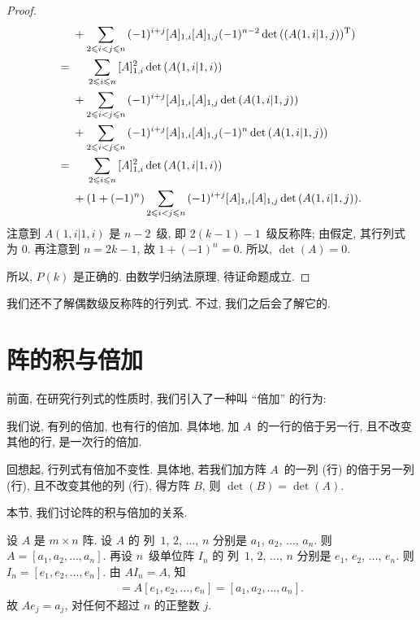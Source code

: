 \begin{proof}
\begin{align*}
             & +
        \sum_{2 \leq i < j \leq n} {
            (-1)^{i+j}
                [A]_{1,i} [A]_{1,j}
            (-1)^{n-2} \det {((A(1,i|1,j))^{\mathrm{T}})}
        }
        \\
        = {} &
        \hphantom{{} + {}}
        \sum_{2 \leq i \leq n} {
            [A]_{1,i}^2 \det {(A(1,i|1,i))}
        }
        \\
             & +
        \sum_{2 \leq i < j \leq n} {
            (-1)^{i+j}
                [A]_{1,i} [A]_{1,j} \det {(A(1,i|1,j))}
        }
        \\
             & +
        \sum_{2 \leq i < j \leq n} {
            (-1)^{i+j}
                [A]_{1,i} [A]_{1,j}
            (-1)^{n} \det {(A(1,i|1,j))}
        }
        \\
        = {} &
        \hphantom{{} + {}}
        \sum_{2 \leq i \leq n} {
            [A]_{1,i}^2 \det {(A(1,i|1,i))}
        }
        \\
             & + (1 + (-1)^n)
        \sum_{2 \leq i < j \leq n} {
            (-1)^{i+j}
                [A]_{1,i} [A]_{1,j} \det {(A(1,i|1,j))}
        }.
    \end{align*}
    注意到 \(A(1,i|1,i)\) 是
    \(n - 2\)~级,
    即 \(2(k-1) - 1\)~级反称阵;
    由假定,
    其行列式为 \(0\).
    再注意到 \(n = 2k - 1\),
    故 \(1 + (-1)^n = 0\).
    所以, \(\det {(A)} = 0\).

    所以, \(P(k)\) 是正确的.
    由数学归纳法原理, 待证命题成立.
\end{proof}

我们还不了解偶数级反称阵的行列式.
不过, 我们之后会了解它的.

\section{阵的积与倍加}

前面, 在研究行列式的性质时, 我们引入了一种叫 ``倍加'' 的行为:

\DefinitionMultiplyAndAdd*

我们说, 有列的倍加, 也有行的倍加.
具体地, 加 \(A\)~的一行的倍于另一行,
且不改变其他的行, 是一次行的倍加.

回想起, 行列式有倍加不变性.
具体地, 若我们加方阵 \(A\)~的一列 (行) 的倍于另一列 (行),
且不改变其他的列 (行), 得方阵 \(B\),
则 \(\det {(B)} = \det {(A)}\).

本节, 我们讨论阵的积与倍加的关系.

设 \(A\) 是 \(m \times n\) 阵.
设 \(A\) 的%
列~\(1\), \(2\), \(\dots\), \(n\) 分别是
\(a_1\), \(a_2\), \(\dots\), \(a_n\).
则 \(A = [a_1, a_2, \dots, a_n]\).
再设 \(n\)~级单位阵 \(I_n\) 的%
列~\(1\), \(2\), \(\dots\), \(n\) 分别是
\(e_1\), \(e_2\), \(\dots\), \(e_n\).
则 \(I_n = [e_1, e_2, \dots, e_n]\).
由 \(A I_n = A\), 知
\begin{align*}
    [Ae_1, Ae_2, \dots, Ae_n]
    = A[e_1, e_2, \dots, e_n]
    = [a_1, a_2, \dots, a_n].
\end{align*}
故 \(Ae_j = a_j\),
对任何不超过 \(n\) 的正整数 \(j\).


